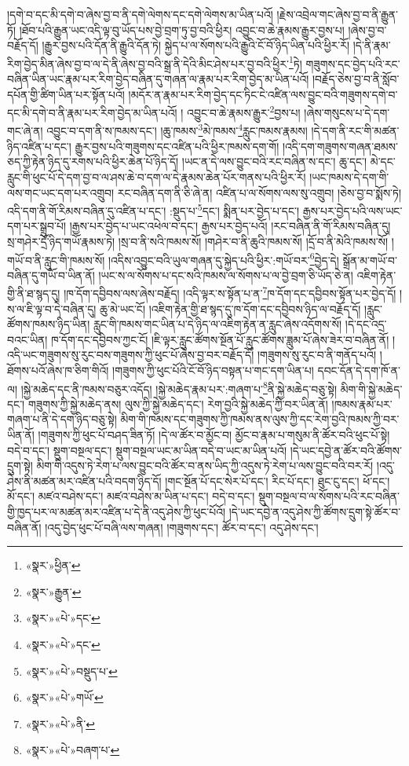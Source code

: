 །དགེ་བ་དང་མི་དགེ་བ་ཞེས་བྱ་བ་ནི་དགེ་ལེགས་དང་དགེ་ལེགས་མ་ཡིན་པའོ། །རྗེས་འབྲེལ་གང་ཞེས་བྱ་བ་ནི་རྒྱུན་ཏོ། །ཐོབ་པའི་རྒྱུན་ཡང་འདི་ལྟ་བུ་ཡོད་པས་བྱེ་བྲག་ཏུ་བྱ་བའི་ཕྱིར། འབྱུང་བ་ཆེ་རྣམས་རྒྱུར་བྱས་པ། །ཞེས་བྱ་བ་བརྗོད་དོ། །རྒྱུར་བྱས་པའི་དོན་ནི་རྒྱུའི་དོན་ཏེ། སྐྱེད་པ་ལ་སོགས་པའི་རྒྱུའི་ངོ་བོ་ཉིད་ཡིན་པའི་ཕྱིར་རོ། །དེ་ནི་རྣམ་རིག་བྱེད་མིན་ཞེས་བྱ་བ་ལ་དེ་ནི་ཞེས་བྱ་བའི་སྒྲ་ནི་དེའི་མིང་ཤེས་པར་བྱ་བའི་ཕྱིར་\footnote{«སྣར་»ཕྱིན་}ཏེ། གཟུགས་དང་བྱེད་པའི་རང་བཞིན་ཡིན་ཡང་རྣམ་པར་རིག་བྱེད་བཞིན་དུ་གཞན་ལ་རྣམ་པར་རིག་བྱེད་མ་ཡིན་པའོ། །བརྗོད་ཅེས་བྱ་བ་ནི་སློབ་དཔོན་གྱི་ཚིག་ཡིན་པར་སྟོན་པའོ། །མདོར་ན་རྣམ་པར་རིག་བྱེད་དང་ཏིང་ངེ་འཛིན་ལས་བྱུང་བའི་གཟུགས་དགེ་བ་དང་མི་དགེ་བ་ནི་རྣམ་པར་རིག་བྱེད་མ་ཡིན་པའོ། །
འབྱུང་བ་ཆེ་རྣམས་རྒྱུར་\footnote{«སྣར་»རྒྱུན་}བྱས་པ། །ཞེས་གསུངས་པ་དེ་དག་གང་ཞེ་ན། འབྱུང་བ་དག་ནི་ས་ཁམས་དང་། །ཆུ་ཁམས་\footnote{«སྣར་»«པེ་»དང་}མེ་ཁམས་\footnote{«སྣར་»«པེ་»དང་}རླུང་ཁམས་རྣམས། །དེ་དག་ནི་རང་གི་མཚན་ཉིད་འཛིན་པ་དང་། རྒྱུར་བྱས་པའི་གཟུགས་དང་འཛིན་པའི་ཕྱིར་ཁམས་དག་གོ། །འདི་དག་གཟུགས་གཞན་ཐམས་ཅད་ཀྱི་རྟེན་ཉིད་དུ་རགས་པའི་ཕྱིར་ཆེན་པོ་ཉིད་དོ། །ཡང་ན་དེ་ལས་བྱུང་བའི་རང་བཞིན་ས་དང་། ཆུ་དང་། མེ་དང་རླུང་གི་ཕུང་པོ་དེ་དག་བྱ་བ་ལ་ཤས་ཆེ་བ་དག་ལ་དེ་རྣམས་ཆེན་པོར་གནས་པའི་ཕྱིར་རོ། །ཡང་ཁམས་དེ་དག་གི་ལས་གང་ཡང་དག་པར་འགྲུབ། རང་བཞིན་དག་ནི་ཅི་ཞེ་ན། འཛིན་པ་ལ་སོགས་ལས་སུ་འགྲུབ། །ཅེས་བྱ་བ་སྨོས་ཏེ། འདི་དག་ནི་གོ་རིམས་བཞིན་དུ་འཛིན་པ་དང་། :སྡུད་པ་\footnote{«སྣར་»«པེ་»བསྡུད་པ་}དང་། སྨིན་པར་བྱེད་པ་དང་། རྒྱས་པར་བྱེད་པའི་ལས་ཡང་དག་པར་སྒྲུབ་པོ། །རྒྱས་པར་བྱེད་པ་ཡང་འཕེལ་བ་དང་། རྒྱས་པར་བྱེད་པའོ། །རང་བཞིན་ནི་གོ་རིམས་བཞིན་དུ། སྲ་གཤེར་དྲོ་ཉིད་གཡོ་རྣམས་ཏེ། །སྲ་བ་ནི་སའི་ཁམས་སོ། །གཤེར་བ་ནི་ཆུའི་ཁམས་སོ། །དྲོ་བ་ནི་མེའི་ཁམས་སོ། །གཡོ་བ་ནི་རླུང་གི་ཁམས་སོ། །འདིས་འབྱུང་བའི་ཡུལ་གཞན་དུ་སྐྱེད་པའི་ཕྱིར་:གཡོ་བར་\footnote{«སྣར་»«པེ་»གཡོ་}བྱེད་དེ། སྒྲོན་མ་གཡོ་བ་བཞིན་དུ་གཡོ་བ་ཡིན་ནོ། །ཡང་ས་ལ་སོགས་པ་དང་སའི་ཁམས་ལ་སོགས་པ་ལ་བྱེ་བྲག་ཅི་ཡོད་ཅེ་ན། འཇིག་རྟེན་གྱི་ནི་ཐ་སྙད་དུ། །ཁ་དོག་དབྱིབས་ལས་ཞེས་བརྗོད། །འདི་ལྟར་ས་སྟོན་པ་ན་\footnote{«སྣར་»«པེ་»ནི་}ཁ་དོག་དང་དབྱིབས་སྟོན་པར་བྱེད་དོ། །ས་ལ་ཇི་ལྟ་བ་དེ་བཞིན་དུ། ཆུ་མེ་ཡང་ངོ། །འཇིག་རྟེན་གྱི་ཐ་སྙད་དུ་ཁ་དོག་དང་དབྱིབས་ཉིད་ལ་བརྗོད་དོ། །རླུང་ཚོགས་ཁམས་ཉིད་ཡིན། རླུང་གི་ཁམས་གང་ཡིན་པ་དེ་ཉིད་ལ་འཇིག་རྟེན་ན་རླུང་ཞེས་འདོགས་སོ། །དེ་དང་འདྲ་བའང་ཡིན། ཁ་དོག་དང་དབྱིབས་ཀྱང་ངོ། །ཇི་ལྟར་རླུང་ཚོགས་སྔོན་པོ་རླུང་ཚོགས་ཟླུམ་པོ་ཞེས་ཟེར་བ་བཞིན་ནོ། །འདི་ཡང་གཟུགས་སུ་རུང་བས་གཟུགས་ཀྱི་ཕུང་པོ་ཞེས་བྱ་བར་བརྗོད་དོ། །གཟུགས་སུ་རུང་བ་ནི་གནོད་པའོ། །ཐོགས་པའོ་ཞེས་ཁ་ཅིག་གིའོ། །གཟུགས་ཀྱི་ཕུང་པོའི་ངོ་བོ་ཉིད་བསྟན་པ་གང་དག་ཡིན་པ། དབང་དོན་དེ་དག་ཁོ་ན་ལ། །སྐྱེ་མཆེད་དང་ནི་ཁམས་བཅུར་འདོད། །སྐྱེ་མཆེད་རྣམ་པར་:གཞག་པ་\footnote{«སྣར་»«པེ་»བཞག་པ་}ནི་སྐྱེ་མཆེད་བཅུ་སྟེ། མིག་གི་སྐྱེ་མཆེད་དང་། གཟུགས་ཀྱི་སྐྱེ་མཆེད་ནས། ལུས་ཀྱི་སྐྱེ་མཆེད་དང་། རེག་བྱའི་སྐྱེ་མཆེད་ཀྱི་བར་ཡིན་ནོ། །ཁམས་རྣམ་པར་གཞག་པ་ནི་དེ་དག་ཉིད་བཅུ་སྟེ། མིག་གི་ཁམས་དང་གཟུགས་ཀྱི་ཁམས་ནས་ལུས་ཀྱི་དང་རེག་བྱའི་ཁམས་ཀྱི་བར་ཡིན་ནོ། །གཟུགས་ཀྱི་ཕུང་པོ་བཤད་ཟིན་ཏོ། །དེ་ལ་ཚོར་བ་མྱོང་བ། མྱོང་བ་རྣམ་པ་གསུམ་ནི་ཚོར་བའི་ཕུང་པོ་སྟེ། བདེ་བ་དང་། སྡུག་བསྔལ་དང་། སྡུག་བསྔལ་ཡང་མ་ཡིན་བདེ་བ་ཡང་མ་ཡིན་པའོ། །དེ་ཡང་དབྱེ་ན་ཚོར་བའི་ཚོགས་དྲུག་སྟེ། མིག་གི་འདུས་ཏེ་རེག་པ་ལས་བྱུང་བའི་ཚོར་བ་ནས་ཡིད་ཀྱི་འདུས་ཏེ་རེག་པ་ལས་བྱུང་བའི་བར་རོ། །འདུ་ཤེས་ནི་མཚན་མར་འཛིན་པའི་བདག་ཉིད་དོ། །གང་སྔོན་པོ་དང་སེར་པོ་དང་། རིང་པོ་དང་། ཐུང་ངུ་དང་། ཕོ་དང་། མོ་དང་། མཛའ་བཤེས་དང་། མཛའ་བཤེས་མ་ཡིན་པ་དང་། བདེ་བ་དང་། སྡུག་བསྔལ་བ་ལ་སོགས་པའི་རང་བཞིན་གྱི་ཁྱད་པར་ལ་མཚན་མར་འཛིན་པ་དེ་ནི་འདུ་ཤེས་ཀྱི་ཕུང་པོའོ། །དེ་ཡང་དབྱེ་ན་འདུ་ཤེས་ཀྱི་ཚོགས་དྲུག་སྟེ་ཚོར་བ་བཞིན་ནོ། །འདུ་བྱེད་ཕུང་པོ་བཞི་ལས་གཞན། །གཟུགས་དང་། ཚོར་བ་དང་། འདུ་ཤེས་དང་། 